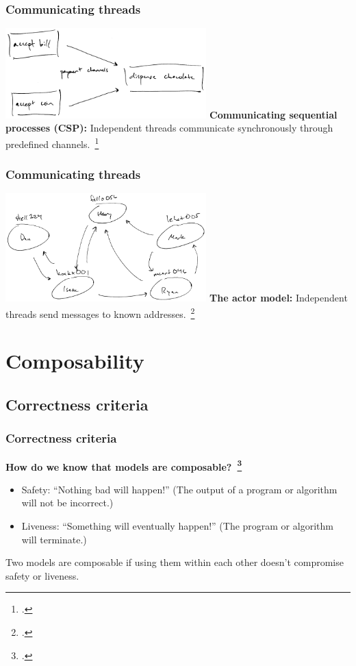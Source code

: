 \documentclass[aspectratio=1610]{beamer}
\begin{document}
  \begin{frame}
    \frametitle{Communicating threads}
    \centering

    \includegraphics[width=220pt]{../figures/csp}
    \vfill
    \textbf{Communicating sequential processes (CSP):} Independent threads communicate synchronously through predefined channels.~\footcite{Hoare1978}
  \end{frame}

  \begin{frame}
    \frametitle{Communicating threads}
    \centering

    \includegraphics[width=220pt]{../figures/actor}
    \vfill
    \textbf{The actor model:} Independent threads send messages to known addresses.~\footcite{Agha1986}
  \end{frame}


  \section{Composability}

  \subsection{Correctness criteria}

  \begin{frame}
    \frametitle{Correctness criteria}

    \textbf{How do we know that models are composable?~\footcite{Swalens2014}}

    \begin{itemize}
      \item Safety: ``Nothing bad will happen!'' (The output of a program or algorithm will not be incorrect.)
      \item Liveness: ``Something will eventually happen!'' (The program or algorithm will terminate.)
    \end{itemize}

    Two models are composable if using them within each other doesn't compromise safety or liveness.
  \end{frame}
\end{document}
